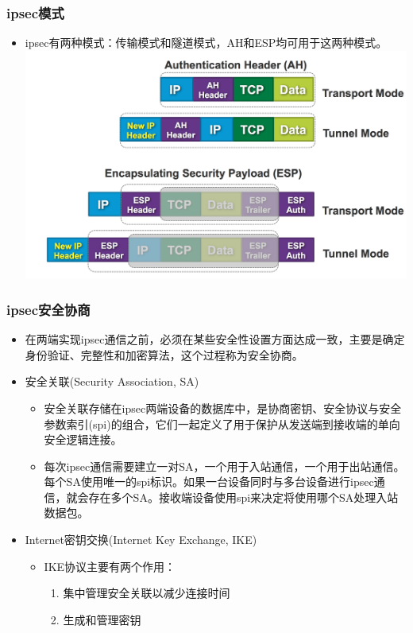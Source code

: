 \documentclass[xcolor=svgnames,presentation]{beamer}
\begin{document}
\begin{frame}
\frametitle{ipsec模式}
\label{sec-4-4}
\begin{itemize}

\item ipsec有两种模式：传输模式和隧道模式，AH和ESP均可用于这两种模式。\\
\label{sec-4-4-1}%
\includegraphics[width=.9\linewidth]{img/ipsec04.png}
\end{itemize} %
\end{frame}
\begin{frame}
\frametitle{ipsec安全协商}
\label{sec-4-5}
\begin{itemize}

\item 在两端实现ipsec通信之前，必须在某些安全性设置方面达成一致，主要是确定身份验证、完整性和加密算法，这个过程称为安全协商。
\label{sec-4-5-1}%

\item 安全关联(Security Association, SA)
\label{sec-4-5-2}%
\begin{itemize}

\item 安全关联存储在ipsec两端设备的数据库中，是协商密钥、安全协议与安全参数索引(spi)的组合，它们一起定义了用于保护从发送端到接收端的单向安全逻辑连接。
\label{sec-4-5-2-1}%

\item 每次ipsec通信需要建立一对SA，一个用于入站通信，一个用于出站通信。每个SA使用唯一的spi标识。如果一台设备同时与多台设备进行ipsec通信，就会存在多个SA。接收端设备使用spi来决定将使用哪个SA处理入站数据包。
\label{sec-4-5-2-2}%
\end{itemize} %

\item Internet密钥交换(Internet Key Exchange, IKE)
\label{sec-4-5-3}%
\begin{itemize}

\item IKE协议主要有两个作用：
\label{sec-4-5-3-1}%
\begin{enumerate}
\item 集中管理安全关联以减少连接时间
\item 生成和管理密钥
\end{enumerate}
\end{itemize} %
\end{itemize} %
\end{frame}
\end{document}
